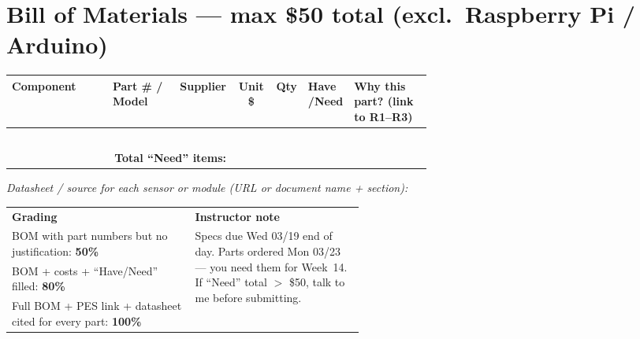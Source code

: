 \documentclass[11pt,a4paper]{article}
\begin{document}
\section{Bill of Materials --- max \$50 total (excl.\ Raspberry Pi / Arduino)}

\renewcommand{\arraystretch}{1.22}
\begin{tabularx}{\linewidth}{@{}p{0.24\linewidth} p{0.16\linewidth} p{0.12\linewidth} c c p{0.10\linewidth} X@{}}
  \toprule
  \textbf{Component} & \textbf{Part \# / Model} & \textbf{Supplier} &
  \textbf{Unit \$} & \textbf{Qty} & \textbf{Have /\newline Need} &
  \textbf{Why this part? (link to R1--R3)} \\
  \midrule
  & & & & & & \\[5pt]
  & & & & & & \\[5pt]
  & & & & & & \\[5pt]
  & & & & & & \\[5pt]
  & & & & & & \\[3pt]
  \midrule
  \multicolumn{3}{r}{\textbf{Total ``Need'' items:}} &
  \multicolumn{4}{l}{\underline{\hspace{2.4cm}}} \\
  \bottomrule
\end{tabularx}

\vspace{2pt}
{\small\textit{Datasheet / source for each sensor or module (URL or document name + section):}}\par
\noindent\hrulefill\par
\noindent\hrulefill

\vspace{3pt}
\begin{mdframed}[backgroundcolor=notebg, linecolor=noteborder, linewidth=0.8pt,
                 innertopmargin=4pt, innerbottommargin=4pt,
                 innerleftmargin=7pt, innerrightmargin=7pt]
\small
\begin{tabularx}{\linewidth}{@{}p{0.52\linewidth} X@{}}
  \textbf{Grading} & \textbf{Instructor note} \\[2pt]
  BOM with part numbers but no justification: \textbf{50\%} &
  \multirow{3}{*}{Specs due Wed 03/19 end of day.
  Parts ordered Mon 03/23 --- you need them for Week~14.
  If ``Need'' total $>$ \$50, talk to me before submitting.} \\
  BOM + costs + ``Have/Need'' filled: \textbf{80\%} & \\
  Full BOM + PES link + datasheet cited for every part: \textbf{100\%} & \\
\end{tabularx}
\end{mdframed}
\end{document}
